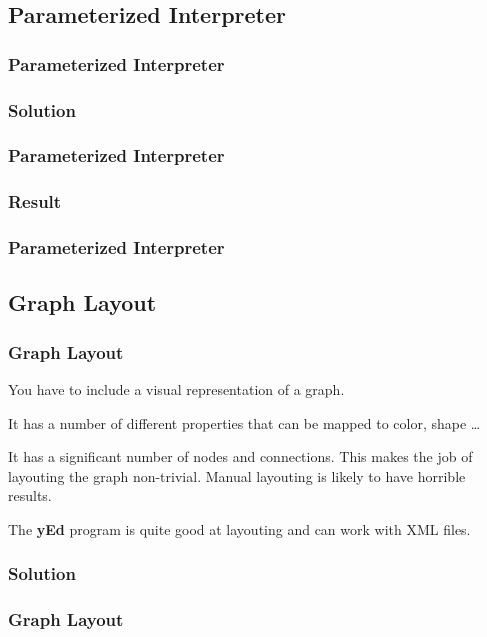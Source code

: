 {\subsection{Parameterized Interpreter}
\begin{frame}[fragile]
  \frametitle{Parameterized Interpreter}
  \vspace{3mm}
  
\end{frame}

\subsubsection{Solution}
\begin{frame}[fragile]
  \frametitle{Parameterized Interpreter }
  \vspace{3mm}
  
\end{frame}

\subsubsection{Result}
\begin{frame}[fragile]
  \frametitle{Parameterized Interpreter }
  \vspace{3mm}
  
\end{frame}

\subsection{Graph Layout}
\begin{frame}[fragile]
  \frametitle{Graph Layout}
  \vspace{3mm}
  You have to include a visual representation of a graph.
  
  \vspace{5mm}
  It has a number of different properties that can be mapped to color, shape \ldots
  
  \vspace{5mm}
  It has a significant number of nodes and connections. This makes the job of layouting the graph non-trivial. Manual layouting is likely to have horrible results.
  
  \vspace{5mm}
  The \textbf{yEd} program is quite good at layouting and can work with XML files.
\end{frame}

\subsubsection{Solution}
\begin{frame}[fragile]
  \frametitle{Graph Layout }
  \vspace{3mm}
  

\end{frame}}

